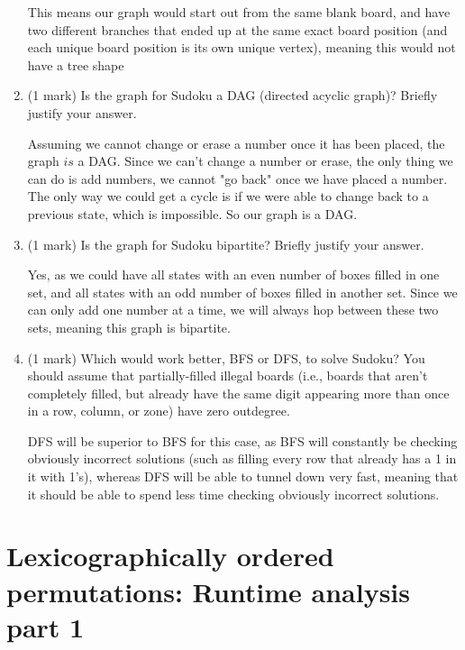 \documentclass[11pt]{article}
\begin{document}
\begin{enumerate}
\begin{soln}
This means our graph would start out from the same blank board, and have two different branches that ended up at the same exact board position (and each unique board position is its own unique vertex), meaning this would not have a tree shape

\end{soln}

\item (1 mark)
Is the graph for Sudoku a DAG (directed acyclic graph)?
Briefly justify your answer.

\begin{soln}
Assuming we cannot change or erase a number once it has been placed, the graph $is$ a DAG. Since we can't change a number or erase, the only thing we can do is add numbers, we cannot "go back" once we have placed a number. The only way we could get a cycle is if we were able to change back to a previous state, which is impossible. So our graph is a DAG. 
\end{soln}

\item (1 mark)
Is the graph for Sudoku bipartite?
Briefly justify your answer.

\begin{soln}
Yes, as we could have all states with an even number of boxes filled in one set, and all states with an odd number of boxes filled in another set. Since we can only add one number at a time, we will always hop between these two sets, meaning this graph is bipartite.
\end{soln}

\item (1 mark)
Which would work better, BFS or DFS, to solve Sudoku?
You should assume that partially-filled illegal boards (i.e., boards
that aren't completely filled, but already
have the same digit appearing more than once in a row, column,
or zone) have zero outdegree.

\begin{soln}
DFS will be superior to BFS for this case, as BFS will constantly be checking obviously incorrect solutions (such as filling every row that already has a 1 in it with 1's), whereas DFS will be able to tunnel down very fast, meaning that it should be able to spend less time checking obviously incorrect solutions.
\end{soln}

\end{enumerate}

\newpage
\section{Lexicographically ordered permutations: Runtime analysis part 1}
\end{document}
